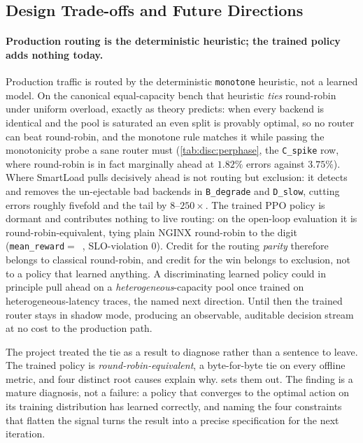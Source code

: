 \subsection{Design Trade-offs and Future Directions}
\label{disc:weaknesses}

\paragraph{Production routing is the deterministic heuristic; the trained policy adds
nothing today.} Production traffic is routed by the deterministic \texttt{monotone}
heuristic, not a learned model. On the canonical equal-capacity bench that heuristic
\emph{ties} round-robin under uniform overload, exactly as theory predicts: when every
backend is identical and the pool is saturated an even split is provably optimal, so no
router can beat round-robin, and the monotone rule matches it while passing the
monotonicity probe a sane router must (\cref{tab:disc:perphase}, the \texttt{C\_spike}
row, where round-robin is in fact marginally ahead at $1.82\%$ errors against
$3.75\%$). Where SmartLoad pulls decisively ahead is not routing but exclusion: it
detects and removes the un-ejectable bad backends in \texttt{B\_degrade} and
\texttt{D\_slow}, cutting errors roughly fivefold and the tail by $8$--$250\times$. The
trained PPO policy is dormant and contributes nothing to live routing: on the open-loop
evaluation it is round-robin-equivalent, tying plain NGINX round-robin to the digit
(\texttt{mean\_reward}$=$~\BMrlPpoReward{}, SLO-violation $0$). Credit for the routing
\emph{parity} therefore belongs to classical round-robin, and credit for the win belongs
to exclusion, not to a policy that learned anything. A discriminating learned policy
could in principle pull ahead on a \emph{heterogeneous}-capacity pool once trained on
heterogeneous-latency traces, the named next direction. Until then the trained router
stays in shadow mode, producing an observable, auditable decision stream at no cost to
the production path.

The project treated the tie as a result to diagnose rather than a sentence to leave.
The trained policy is \emph{round-robin-equivalent}, a byte-for-byte tie on every
offline metric, and four distinct root causes explain why. 
sets them out. The finding is a mature diagnosis, not a failure: a policy that
converges to the optimal action on its training distribution has learned correctly,
and naming the four constraints that flatten the signal turns the result into a precise
specification for the next iteration.

